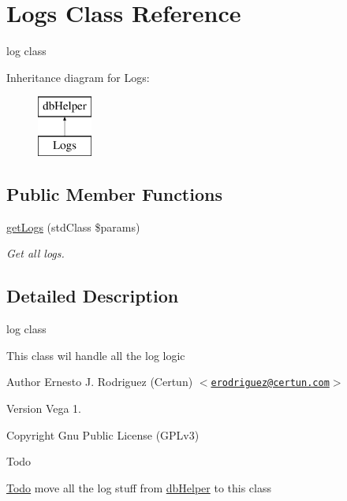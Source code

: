 \hypertarget{class_logs}{\section{\-Logs \-Class \-Reference}
\label{class_logs}
}


log class  


\-Inheritance diagram for \-Logs\-:\begin{figure}[H]
\begin{center}
\leavevmode
\includegraphics[height=2.000000cm]{class_logs}
\end{center}
\end{figure}
\subsection*{\-Public \-Member \-Functions}
\begin{DoxyCompactItemize}
\item 
\hyperlink{class_logs_a9c20ffb4dc836181dd4dcb0fe3c8c5ee}{get\-Logs} (std\-Class \$params)
\begin{DoxyCompactList}\small\item\em \-Get all logs. \end{DoxyCompactList}\end{DoxyCompactItemize}


\subsection{\-Detailed \-Description}
log class 

\-This class wil handle all the log logic

\begin{DoxyAuthor}{\-Author}
\-Ernesto \-J. \-Rodriguez (\-Certun) $<$\href{mailto:erodriguez@certun.com}{\tt erodriguez@certun.\-com}$>$ 
\end{DoxyAuthor}
\begin{DoxyVersion}{\-Version}
\-Vega 1. 
\end{DoxyVersion}
\begin{DoxyCopyright}{\-Copyright}
\-Gnu \-Public \-License (\-G\-P\-Lv3)
\end{DoxyCopyright}
\begin{DoxyRefDesc}{\-Todo}
\item[\hyperlink{todo__todo000001}{\-Todo}]move all the log stuff from \hyperlink{classdb_helper}{db\-Helper} to this class\end{DoxyRefDesc}


